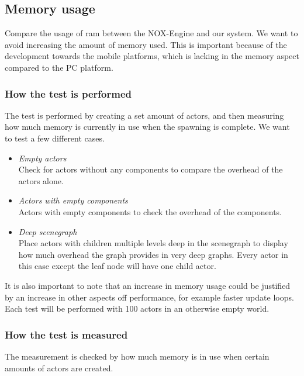\subsection{Memory usage}
Compare the usage of ram between the NOX-Engine and our system.
We want to avoid increasing the amount of memory used.
This is important because of the development towards the mobile platforms, which is lacking in the memory aspect compared to the PC platform.

\subsubsection*{How the test is performed}
The test is performed by creating a set amount of actors, and then measuring how much memory is currently in use when the spawning is complete.
We want to test a few different cases.

\begin{itemize}

    \item\noindent\textit{Empty actors}\\
    Check for actors without any components to compare the overhead of the actors alone.

    \item\noindent\textit{Actors with empty components}\\
    Actors with empty components to check the overhead of the components.

    \item\noindent\textit{Deep scenegraph}\\
    Place actors with children multiple levels deep in the scenegraph to display how much overhead the graph provides in very deep graphs.
    Every actor in this case except the leaf node will have one child actor.


\end{itemize}

\noindent It is also important to note that an increase in memory usage could be justified by an increase in other aspects off performance, for example faster update loops.
Each test will be performed with 100 actors in an otherwise empty world.

\subsubsection*{How the test is measured}
The measurement is checked by how much memory is in use when certain amounts of actors are created.
